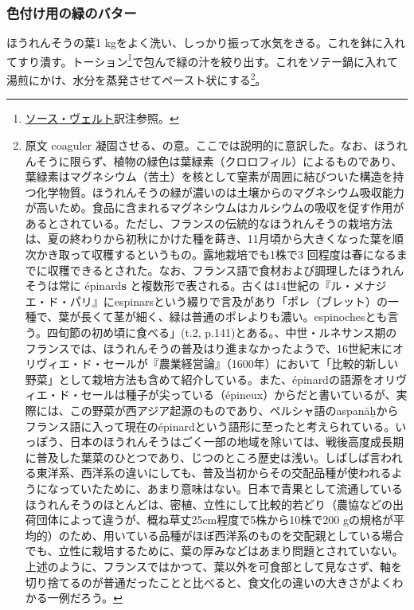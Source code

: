 \begin{recette}
\hypertarget{beurre-colorant-vert}{%
\subsubsection{色付け用の緑のバター}\label{beurre-colorant-vert}}



ほうれんそうの葉1
kgをよく洗い、しっかり振って水気をきる。これを鉢に入れてすり潰す。トーション\footnote{\protect\hyperlink{sauce-verte}{ソース・ヴェルト}訳注参照。}で包んで緑の汁を絞り出す。これをソテー鍋に入れて湯煎にかけ、水分を蒸発させてペースト状にする\footnote{原文
  coaguler
  凝固させる、の意。ここでは説明的に意訳した。なお、ほうれんそうに限らず、植物の緑色は葉緑素（クロロフィル）によるものであり、葉緑素はマグネシウム（苦土）を核として窒素が周囲に結びついた構造を持つ化学物質。ほうれんそうの緑が濃いのは土壌からのマグネシウム吸収能力が高いため。食品に含まれるマグネシウムはカルシウムの吸収を促す作用があるとされている。ただし、フランスの伝統的なほうれんそうの栽培方法は、夏の終わりから初秋にかけた種を蒔き、11月頃から大きくなった葉を順次かき取って収穫するというもの。露地栽培でも1株で3
  回程度は春になるまでに収穫できるとされた。なお、フランス語で食材および調理したほうれんそうは常に
  épinard\textbf{s}
  と複数形で表される。古くは14世紀の『ル・メナジエ・ド・パリ』にespinarsという綴りで言及があり「ポレ（ブレット）の一種で、葉が長くて茎が細く、緑は普通のポレよりも濃い。espinochesとも言う。四旬節の初め頃に食べる」(t.2,
  p.141)とある。、中世・ルネサンス期のフランスでは、ほうれんそうの普及はり進まなかったようで、16世紀末にオリヴィエ・ド・セールが『農業経営論』（1600年）において「比較的新しい野菜」として栽培方法も含めて紹介している。また、épinardの語源をオリヴィエ・ド・セールは種子が尖っている（épineux）からだと書いているが、実際には、この野菜が西アジア起源のものであり、ペルシャ語のaspanāḫからフランス語に入って現在のépinardという語形に至ったと考えられている。いっぽう、日本のほうれんそうはごく一部の地域を除いては、戦後高度成長期に普及した葉菜のひとつであり、じつのところ歴史は浅い。しばしば言われる東洋系、西洋系の違いにしても、普及当初からその交配品種が使われるようになっていたために、あまり意味はない。日本で青果として流通しているほうれんそうのほとんどは、密植、立性にして比較的若どり（農協などの出荷団体によって違うが、概ね草丈25cm程度で5株から10株で200
  gの規格が平均的）のため、用いている品種がほぼ西洋系のものを交配親としている場合でも、立性に栽培するために、葉の厚みなどはあまり問題とされていない。上述のように、フランスではかつて、葉以外を可食部として見なさず、軸を切り捨てるのが普通だったことと比べると、食文化の違いの大きさがよくわかる一例だろう。}。


\end{recette}
